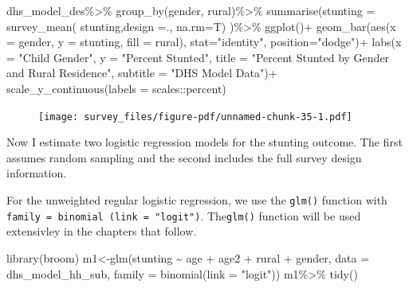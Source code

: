 \documentclass[
  letterpaper,
  DIV=11,
  numbers=noendperiod]{scrreprt}
\newenvironment{Shaded}{\begin{snugshade}}{\end{snugshade}}
\newcommand{\AttributeTok}[1]{\textcolor[rgb]{0.40,0.45,0.13}{#1}}
\newcommand{\FunctionTok}[1]{\textcolor[rgb]{0.28,0.35,0.67}{#1}}
\newcommand{\NormalTok}[1]{\textcolor[rgb]{0.00,0.23,0.31}{#1}}
\newcommand{\OtherTok}[1]{\textcolor[rgb]{0.00,0.23,0.31}{#1}}
\newcommand{\SpecialCharTok}[1]{\textcolor[rgb]{0.37,0.37,0.37}{#1}}
\newcommand{\StringTok}[1]{\textcolor[rgb]{0.13,0.47,0.30}{#1}}
\begin{document}
\begin{Shaded}
\begin{Highlighting}[]
\NormalTok{dhs\_model\_des}\SpecialCharTok{\%\textgreater{}\%}
  \FunctionTok{group\_by}\NormalTok{(gender, rural)}\SpecialCharTok{\%\textgreater{}\%}
  \FunctionTok{summarise}\NormalTok{(}\AttributeTok{stunting =} \FunctionTok{survey\_mean}\NormalTok{( stunting,}\AttributeTok{design =}\NormalTok{.,}
                              \AttributeTok{na.rm=}\NormalTok{T) )}\SpecialCharTok{\%\textgreater{}\%}
  \FunctionTok{ggplot}\NormalTok{()}\SpecialCharTok{+}
  \FunctionTok{geom\_bar}\NormalTok{(}\FunctionTok{aes}\NormalTok{(}\AttributeTok{x =}\NormalTok{ gender, }\AttributeTok{y  =}\NormalTok{ stunting, }\AttributeTok{fill =}\NormalTok{ rural),}
           \AttributeTok{stat=}\StringTok{"identity"}\NormalTok{,}
           \AttributeTok{position=}\StringTok{"dodge"}\NormalTok{)}\SpecialCharTok{+}
  \FunctionTok{labs}\NormalTok{(}\AttributeTok{x =} \StringTok{"Child Gender"}\NormalTok{, }
       \AttributeTok{y =} \StringTok{"Percent Stunted"}\NormalTok{, }
       \AttributeTok{title =} \StringTok{"Percent Stunted by Gender and Rural Residence"}\NormalTok{,}
       \AttributeTok{subtitle =} \StringTok{"DHS Model Data"}\NormalTok{)}\SpecialCharTok{+}
  \FunctionTok{scale\_y\_continuous}\NormalTok{(}\AttributeTok{labels =}\NormalTok{ scales}\SpecialCharTok{::}\NormalTok{percent)}
\end{Highlighting}
\end{Shaded}

\begin{figure}[H]

{\centering \texttt{[image: survey\_files/figure-pdf/unnamed-chunk-35-1.pdf]}

}

\end{figure}

Now I estimate two logistic regression models for the stunting outcome.
The first assumes random sampling and the second includes the full
survey design information.

For the unweighted regular logistic regression, we use the
\texttt{glm()} function with
\texttt{family\ =\ binomial\ (link\ =\ "logit")}. The\texttt{glm()}
function will be used extensivley in the chapters that follow.

\begin{Shaded}
\begin{Highlighting}[]
\FunctionTok{library}\NormalTok{(broom)}
\NormalTok{m1}\OtherTok{\textless{}{-}}\FunctionTok{glm}\NormalTok{(stunting }\SpecialCharTok{\textasciitilde{}}\NormalTok{ age }\SpecialCharTok{+}\NormalTok{ age2 }\SpecialCharTok{+}\NormalTok{ rural }\SpecialCharTok{+}\NormalTok{ gender,}
              \AttributeTok{data =}\NormalTok{ dhs\_model\_hh\_sub,}
              \AttributeTok{family =} \FunctionTok{binomial}\NormalTok{(}\AttributeTok{link =} \StringTok{"logit"}\NormalTok{))}
\NormalTok{m1}\SpecialCharTok{\%\textgreater{}\%}
  \FunctionTok{tidy}\NormalTok{()}
\end{Highlighting}
\end{Shaded}
\end{document}
